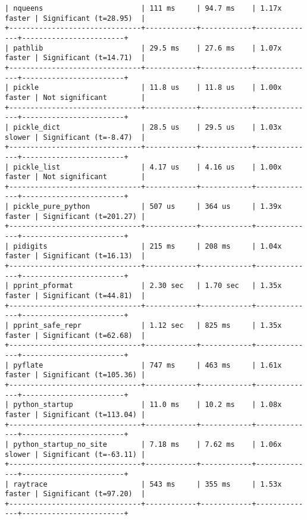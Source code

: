 \begin{code}
\begin{verbatim}
| nqueens                       | 111 ms     | 94.7 ms    | 1.17x faster | Significant (t=28.95)  |
+-------------------------------+------------+------------+--------------+------------------------+
| pathlib                       | 29.5 ms    | 27.6 ms    | 1.07x faster | Significant (t=14.71)  |
+-------------------------------+------------+------------+--------------+------------------------+
| pickle                        | 11.8 us    | 11.8 us    | 1.00x faster | Not significant        |
+-------------------------------+------------+------------+--------------+------------------------+
| pickle_dict                   | 28.5 us    | 29.5 us    | 1.03x slower | Significant (t=-8.47)  |
+-------------------------------+------------+------------+--------------+------------------------+
| pickle_list                   | 4.17 us    | 4.16 us    | 1.00x faster | Not significant        |
+-------------------------------+------------+------------+--------------+------------------------+
| pickle_pure_python            | 507 us     | 364 us     | 1.39x faster | Significant (t=201.27) |
+-------------------------------+------------+------------+--------------+------------------------+
| pidigits                      | 215 ms     | 208 ms     | 1.04x faster | Significant (t=16.13)  |
+-------------------------------+------------+------------+--------------+------------------------+
| pprint_pformat                | 2.30 sec   | 1.70 sec   | 1.35x faster | Significant (t=44.81)  |
+-------------------------------+------------+------------+--------------+------------------------+
| pprint_safe_repr              | 1.12 sec   | 825 ms     | 1.35x faster | Significant (t=62.68)  |
+-------------------------------+------------+------------+--------------+------------------------+
| pyflate                       | 747 ms     | 463 ms     | 1.61x faster | Significant (t=105.36) |
+-------------------------------+------------+------------+--------------+------------------------+
| python_startup                | 11.0 ms    | 10.2 ms    | 1.08x faster | Significant (t=113.04) |
+-------------------------------+------------+------------+--------------+------------------------+
| python_startup_no_site        | 7.18 ms    | 7.62 ms    | 1.06x slower | Significant (t=-63.11) |
+-------------------------------+------------+------------+--------------+------------------------+
| raytrace                      | 543 ms     | 355 ms     | 1.53x faster | Significant (t=97.20)  |
+-------------------------------+------------+------------+--------------+------------------------+

\end{verbatim}
\end{code}
